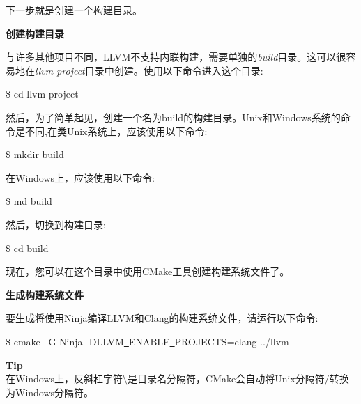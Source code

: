 下一步就是创建一个构建目录。\par

\hspace*{\fill} \par %
\textbf{创建构建目录}

与许多其他项目不同，LLVM不支持内联构建，需要单独的\textit{build}目录。这可以很容易地在\textit{llvm-project}目录中创建。使用以下命令进入这个目录:\par

\begin{tcolorbox}[colback=white,colframe=black]
	\$ cd llvm-project
\end{tcolorbox}

然后，为了简单起见，创建一个名为build的构建目录。Unix和Windows系统的命令是不同,在类Unix系统上，应该使用以下命令:\par

\begin{tcolorbox}[colback=white,colframe=black]
	\$ mkdir build
\end{tcolorbox}

在Windows上，应该使用以下命令:\par

\begin{tcolorbox}[colback=white,colframe=black]
	\$ md build
\end{tcolorbox}

然后，切换到构建目录:\par

\begin{tcolorbox}[colback=white,colframe=black]
	\$ cd build
\end{tcolorbox}

现在，您可以在这个目录中使用CMake工具创建构建系统文件了。\par

\hspace*{\fill} \par %
\textbf{生成构建系统文件}

要生成将使用Ninja编译LLVM和Clang的构建系统文件，请运行以下命令:\par

\begin{tcolorbox}[colback=white,colframe=black]
	\$ cmake –G Ninja -DLLVM\underline{~}ENABLE\underline{~}PROJECTS=clang ../llvm
\end{tcolorbox}

\begin{tcolorbox}[colback=blue!5!white,colframe=blue!75!black]
	\textbf{Tip} \\
	在Windows上，反斜杠字符$\setminus$是目录名分隔符，CMake会自动将Unix分隔符/转换为Windows分隔符。
\end{tcolorbox}

